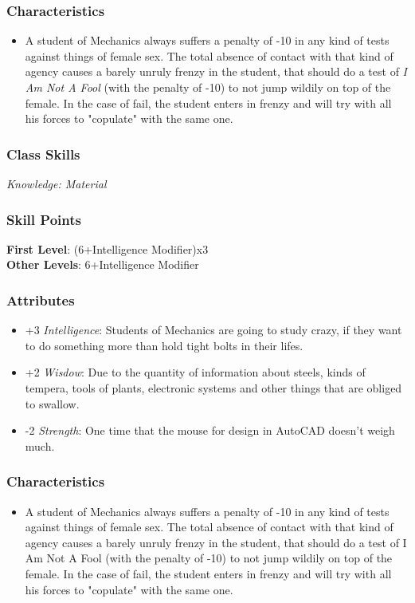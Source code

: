 \documentclass[ letterpaper,12pt]{article}
\begin{document}
\subsubsection{Characteristics}
\begin{itemize}
\item{A  student  of Mechanics always suffers a penalty of  -10  in  any  kind  of  tests against things of female sex.  The  total absence  of  contact  with  that  kind of agency causes a  barely unruly  frenzy in the  student,  that  should  do a test of {\it I Am Not A Fool} (with the penalty of -10) to not jump wildily on top of the female. In the  case  of fail, the student enters in  frenzy  and  will  try  with  all his forces to "copulate" with the same one.}
\end{itemize}

\subsubsection{Class Skills}
{\it Knowledge: Material}

\subsubsection{Skill Points}
{\bf First Level}: (6+Intelligence Modifier)x3\\
{\bf Other Levels}: 6+Intelligence Modifier\\

\subsubsection{Attributes}
\begin{itemize}
\item{+3 {\it Intelligence}: Students  of Mechanics are going to study crazy, if they want to  do something more than  hold tight bolts in their lifes.}
\item{+2 {\it Wisdow}: Due  to the quantity of information about steels,  kinds  of   tempera,   tools  of plants,  electronic   systems  and  other things that  are  obliged to swallow.}
\item{-2 {\it Strength}: One  time that the  mouse  for  design  in  AutoCAD doesn't weigh much.}
\end{itemize}


\subsubsection{Characteristics}
\begin{itemize}
\item{A  student  of Mechanics always suffers a penalty of  -10  in  any  kind  of  tests against things of female sex.  The  total absence  of  contact  with  that  kind of agency causes a  barely unruly  frenzy in the  student,  that  should  do a test of I Am Not A Fool (with the penalty of -10) to not jump wildily on top of the female. In the  case  of fail, the student enters in  frenzy  and  will  try  with  all his forces to "copulate" with the same one.}
\end{itemize}
\end{document}
